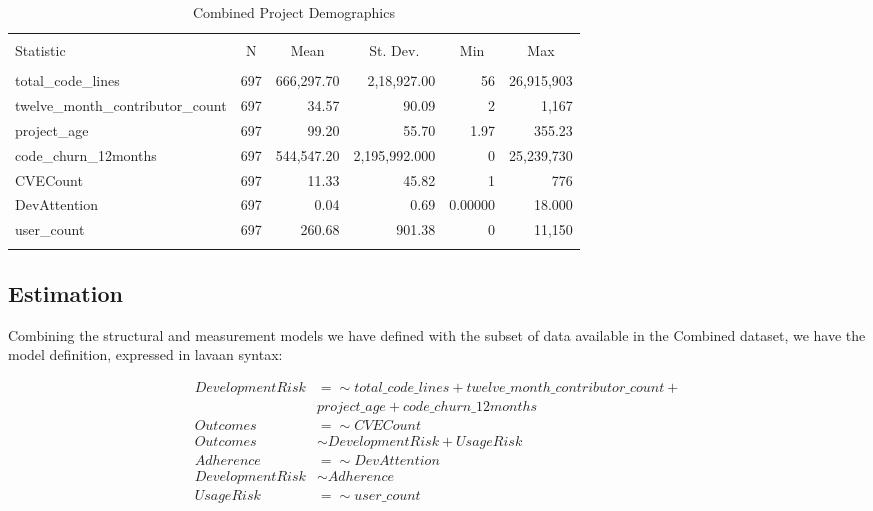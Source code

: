 \begin{table}[!htbp] \centering 
  \caption{Combined Project Demographics} 
  \label{tab:openhub_demog} 
\begin{tabular}{@{\extracolsep{5pt}}lrrrrr} 
\\[-1.8ex]\hline \\[-1.8ex] 
Statistic & \multicolumn{1}{c}{N} & \multicolumn{1}{c}{Mean} & \multicolumn{1}{c}{St. Dev.} & \multicolumn{1}{c}{Min} & \multicolumn{1}{c}{Max} \\ 
\hline \\[-1.8ex] 
total\_code\_lines & 697 & 666,297.70 & 2,18,927.00 & 56 & 26,915,903 \\ 
twelve\_month\_contributor\_count & 697 & 34.57 & 90.09 & 2 & 1,167 \\ 
project\_age & 697 & 99.20 & 55.70 & 1.97 & 355.23 \\ 
code\_churn\_12months & 697 & 544,547.20 & 2,195,992.000 & 0 & 25,239,730 \\ 
CVECount & 697 & 11.33 & 45.82 & 1 & 776 \\ 
DevAttention & 697 & 0.04 & 0.69 & 0.00000 & 18.000 \\ 
user\_count & 697 & 260.68 & 901.38 & 0 & 11,150 \\ 
\hline \\[-1.8ex]
\end{tabular} 
\end{table}

\subsection{Estimation}

Combining the structural and measurement models we have defined with the subset of data available in the Combined dataset, we have the model definition, expressed in lavaan syntax: 

\begin{equation}
\begin{split}
	DevelopmentRisk &=\sim total\_code\_lines + twelve\_month\_contributor\_count +\\ 
	& project\_age + code\_churn\_12months\\
 Outcomes &=\sim CVECount \\
 Outcomes &\sim DevelopmentRisk + UsageRisk\\
 Adherence &=\sim DevAttention\\
 DevelopmentRisk &\sim  Adherence\\
 UsageRisk &=\sim user\_count\\
\end{split}
\end{equation}		

